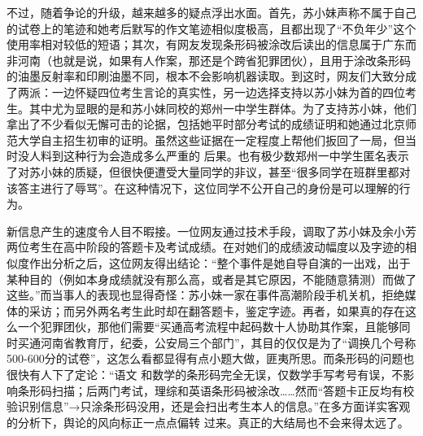 \documentclass{article}
\begin{document}
不过，随着争论的升级，越来越多的疑点浮出⽔⾯。⾸先，苏⼩妹声称不属于⾃⼰的试卷上的笔迹和她考后默写的作⽂笔迹相似度极⾼，且都出现了“不负年少”这个使⽤率相对较低的短语；其次，有⽹友发现条形码被涂改后读出的信息属于⼴东⽽⾮河南（也就是说，如果有⼈作案，那还是个跨省犯罪团伙），且⽤于涂改条形码的油墨反射率和印刷油墨不同，根本不会影响机器读取。到这时，⽹友们⼤致分成了两派：⼀边怀疑四位考⽣⾔论的真实性，另⼀边选择⽀持以苏⼩妹为⾸的四位考⽣。其中尤为显眼的是和苏⼩妹同校的郑州⼀中学⽣群体。为了⽀持苏⼩妹，他们拿出了不少看似⽆懈可击的论据，包括她平时部分考试的成绩证明和她通过北京师范⼤学⾃主招⽣初审的证明。虽然这些证据在⼀定程度上帮他们扳回了⼀局，但当时没⼈料到这种⾏为会造成多么严重的
\newpage
后果。也有极少数郑州⼀中学⽣匿名表⽰了对苏⼩妹的质疑，但很快便遭受⼤量同学的⾮议，甚⾄“很多同学在班群⾥都对该答主进⾏了辱骂”。在这种情况下，这位同学不公开⾃⼰的⾝份是可以理解的⾏为。
 

新信息产⽣的速度令⼈⽬不暇接。⼀位⽹友通过技术⼿段，调取了苏⼩妹及余⼩芳两位考⽣在⾼中阶段的答题卡及考试成绩。在对她们的成绩波动幅度以及字迹的相似度作出分析之后，这位⽹友得出结论：“整个事件是她⾃导⾃演的⼀出戏，出于某种⽬的（例如本⾝成绩就没有那么⾼，或者是其它原因，不能随意猜测）⽽做了这些。”⽽当事⼈的表现也显得奇怪：苏⼩妹⼀家在事件⾼潮阶段⼿机关机，拒绝媒体的采访；⽽另外两名考⽣此时却在翻答题卡，鉴定字迹。再者，如果真的存在这么⼀个犯罪团伙，那他们需要“买通⾼考流程中起码数⼗⼈协助其作案，且能够同时买通河南省教育厅，纪委，公安局三个部门”，其⽬的仅仅是为了“调换⼏个号称500-600分的试卷”，这怎么看都显得有点⼩题⼤做，匪夷所思。⽽条形码的问题也很快有⼈下了定论：“语⽂
\newpage
和数学的条形码完全⽆误，仅数学⼿写考号有误，不影响条形码扫描；后两门考试，理综和英语条形码被涂改……然⽽“答题卡正反均有校验识别信息”→只涂条形码没⽤，还是会扫出考⽣本⼈的信息。”在多⽅⾯详实客观的分析下，舆论的风向标正⼀点点偏转
过来。真正的⼤结局也不会来得太远了。 
\end{document}
